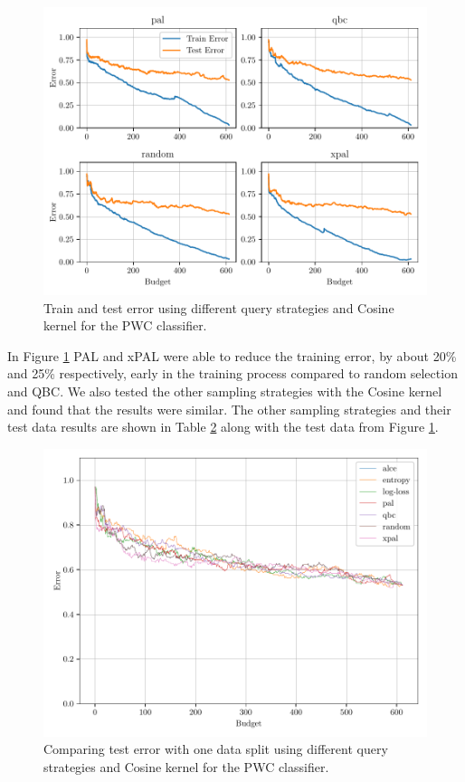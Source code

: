 \begin{figure}[ht]
  \centering
  \includegraphics[width=\scale\textwidth]{../img/plot_all_results_cosine.pdf}
  \caption{Train and test error using different query strategies and Cosine kernel for the PWC classifier.}
  \label{fig:plot_all_results_cosine}
\end{figure}


In Figure \ref{fig:plot_all_results_cosine} PAL and xPAL were able to reduce the training error, by about 20\% and 25\% respectively, early in the training process compared to random selection and QBC. We also tested the other sampling strategies with the Cosine kernel and found that the results were similar. The other sampling strategies and their test data results are shown in Table \ref{fig:cos_test_results} along with the test data from Figure \ref{fig:plot_all_results_cosine}. 


\begin{figure}[ht]
    \centering
    \includegraphics[width=\scale\textwidth]{../img/plot_kernel_cos_test_results.pdf}
    \caption{Comparing test error with one data split using different query strategies and Cosine kernel for the PWC classifier.}
    \label{fig:cos_test_results}
\end{figure}

